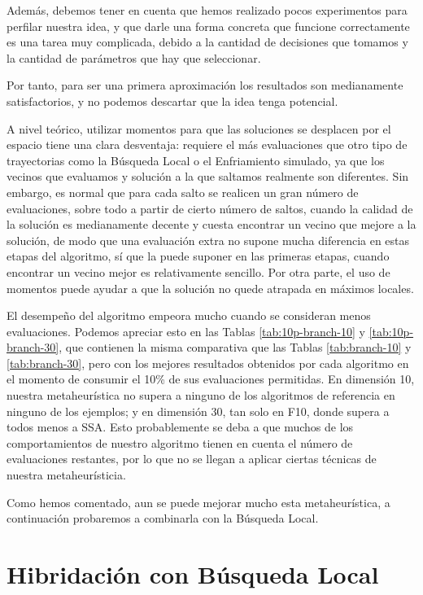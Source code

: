 \documentclass{article}
\begin{document}
Además, debemos tener en cuenta que hemos realizado pocos experimentos para perfilar nuestra idea, y que darle una forma concreta
que funcione correctamente es una tarea muy complicada, debido a la cantidad de decisiones que tomamos y la cantidad de parámetros que
hay que seleccionar.

Por tanto, para ser una primera aproximación los resultados son medianamente satisfactorios, y no podemos descartar que la idea tenga
potencial.

A nivel teórico, utilizar momentos para que las soluciones se desplacen por el espacio tiene una clara desventaja: requiere
el más evaluaciones que otro tipo de trayectorias como la Búsqueda Local o el Enfriamiento simulado, ya que los vecinos que evaluamos
y solución a la que saltamos realmente son diferentes. Sin embargo, es normal que para cada salto se realicen un gran número de
evaluaciones, sobre todo a partir de cierto número de saltos, cuando la calidad de la solución es medianamente decente y cuesta encontrar
un vecino que mejore a la solución, de modo que una evaluación extra no supone mucha diferencia en estas etapas del algoritmo, sí que 
la puede suponer en las primeras etapas, cuando encontrar un vecino mejor es relativamente sencillo. Por otra parte, el uso de momentos
puede ayudar a que la solución no quede atrapada en máximos locales.

El desempeño del algoritmo empeora mucho cuando se consideran menos evaluaciones. Podemos apreciar esto en las Tablas \ref{tab:10p-branch-10} y
 \ref{tab:10p-branch-30},
que contienen la misma comparativa que las Tablas \ref{tab:branch-10} y \ref{tab:branch-30}, pero con los mejores resultados
obtenidos por cada algoritmo en el momento de consumir el 10\% de sus evaluaciones permitidas. En dimensión 10, nuestra metaheurística
no supera a ninguno de los algoritmos de referencia en ninguno de los ejemplos; y en dimensión 30, tan solo en F10, donde supera a todos menos a SSA. Esto probablemente se deba a que
muchos de los comportamientos de nuestro algoritmo tienen en cuenta el número de evaluaciones restantes, por lo que no se llegan a
aplicar ciertas técnicas de nuestra metaheurísticia.

Como hemos comentado, aun se puede mejorar mucho esta metaheurística, a continuación probaremos a combinarla con la Búsqueda Local.

\pagebreak

\section{Hibridación con Búsqueda Local}
\end{document}
